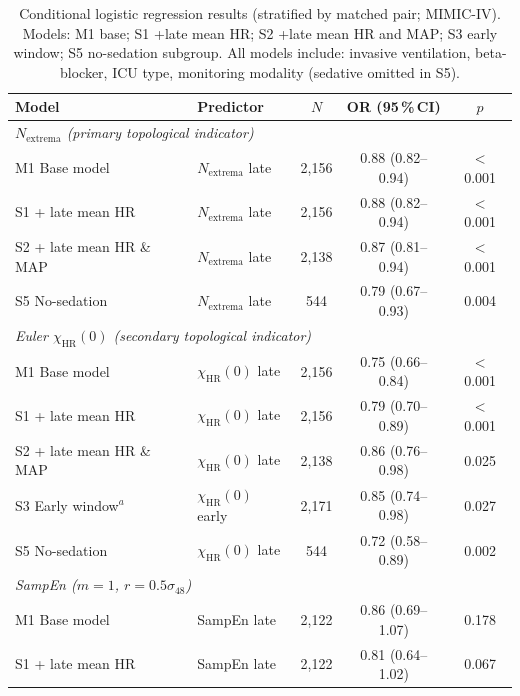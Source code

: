 \documentclass[12pt,a4paper]{article}
\begin{document}
\begin{table}[htbp]
  \centering
  \caption{Conditional logistic regression results (stratified by matched
  pair; MIMIC-IV).
  Models: M1 base; S1 +late mean HR; S2 +late mean HR and MAP;
  S3 early window; S5 no-sedation subgroup.
  All models include: invasive ventilation, beta-blocker, ICU type,
  monitoring modality (sedative omitted in S5).}
  \label{tab:logit}
  \small
  \begin{tabular}{llccc}
    \toprule
    \textbf{Model} & \textbf{Predictor} & \textbf{$N$} &
    \textbf{OR (95\,\%\,CI)} & \textbf{$p$} \\
    \midrule
    \multicolumn{5}{l}{\textit{$N_{\text{extrema}}$ (primary topological indicator)}} \\
    M1 Base model            & $N_{\text{extrema}}$ late  & 2{,}156 & 0.88 (0.82--0.94) & $<$0.001 \\
    S1 + late mean HR        & $N_{\text{extrema}}$ late  & 2{,}156 & 0.88 (0.82--0.94) & $<$0.001 \\
    S2 + late mean HR \& MAP & $N_{\text{extrema}}$ late  & 2{,}138 & 0.87 (0.81--0.94) & $<$0.001 \\
    S5 No-sedation           & $N_{\text{extrema}}$ late  &   544 & 0.79 (0.67--0.93) & 0.004 \\
    \midrule
    \multicolumn{5}{l}{\textit{Euler $\chi_{\text{HR}}(0)$ (secondary topological indicator)}} \\
    M1 Base model            & $\chi_{\text{HR}}(0)$ late  & 2{,}156 & 0.75 (0.66--0.84) & $<$0.001 \\
    S1 + late mean HR        & $\chi_{\text{HR}}(0)$ late  & 2{,}156 & 0.79 (0.70--0.89) & $<$0.001 \\
    S2 + late mean HR \& MAP & $\chi_{\text{HR}}(0)$ late  & 2{,}138 & 0.86 (0.76--0.98) & 0.025 \\
    S3 Early window$^a$      & $\chi_{\text{HR}}(0)$ early & 2{,}171 & 0.85 (0.74--0.98) & 0.027 \\
    S5 No-sedation           & $\chi_{\text{HR}}(0)$ late  &   544 & 0.72 (0.58--0.89) & 0.002 \\
    \midrule
    \multicolumn{5}{l}{\textit{SampEn ($m=1$, $r=0.5\sigma_{48}$)}} \\
    M1 Base model            & SampEn late  & 2{,}122 & 0.86 (0.69--1.07) & 0.178 \\
    S1 + late mean HR        & SampEn late  & 2{,}122 & 0.81 (0.64--1.02) & 0.067 \\

\end{tabular}
\end{table}
\end{document}
